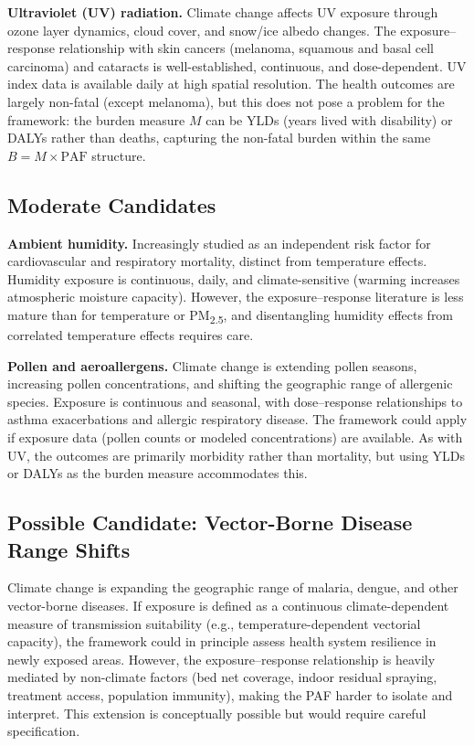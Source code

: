 \documentclass[11pt,a4paper]{article}
\begin{document}
\textbf{Ultraviolet (UV) radiation.} Climate change affects UV exposure through ozone layer dynamics, cloud cover, and snow/ice albedo changes. The exposure--response relationship with skin cancers (melanoma, squamous and basal cell carcinoma) and cataracts is well-established, continuous, and dose-dependent. UV index data is available daily at high spatial resolution. The health outcomes are largely non-fatal (except melanoma), but this does not pose a problem for the framework: the burden measure $M$ can be YLDs (years lived with disability) or DALYs rather than deaths, capturing the non-fatal burden within the same $B = M \times \text{PAF}$ structure.

\subsection{Moderate Candidates}

\textbf{Ambient humidity.} Increasingly studied as an independent risk factor for cardiovascular and respiratory mortality, distinct from temperature effects. Humidity exposure is continuous, daily, and climate-sensitive (warming increases atmospheric moisture capacity). However, the exposure--response literature is less mature than for temperature or PM\textsubscript{2.5}, and disentangling humidity effects from correlated temperature effects requires care.

\textbf{Pollen and aeroallergens.} Climate change is extending pollen seasons, increasing pollen concentrations, and shifting the geographic range of allergenic species. Exposure is continuous and seasonal, with dose--response relationships to asthma exacerbations and allergic respiratory disease. The framework could apply if exposure data (pollen counts or modeled concentrations) are available. As with UV, the outcomes are primarily morbidity rather than mortality, but using YLDs or DALYs as the burden measure accommodates this.

\subsection{Possible Candidate: Vector-Borne Disease Range Shifts}

Climate change is expanding the geographic range of malaria, dengue, and other vector-borne diseases. If exposure is defined as a continuous climate-dependent measure of transmission suitability (e.g., temperature-dependent vectorial capacity), the framework could in principle assess health system resilience in newly exposed areas. However, the exposure--response relationship is heavily mediated by non-climate factors (bed net coverage, indoor residual spraying, treatment access, population immunity), making the PAF harder to isolate and interpret. This extension is conceptually possible but would require careful specification.
\end{document}
